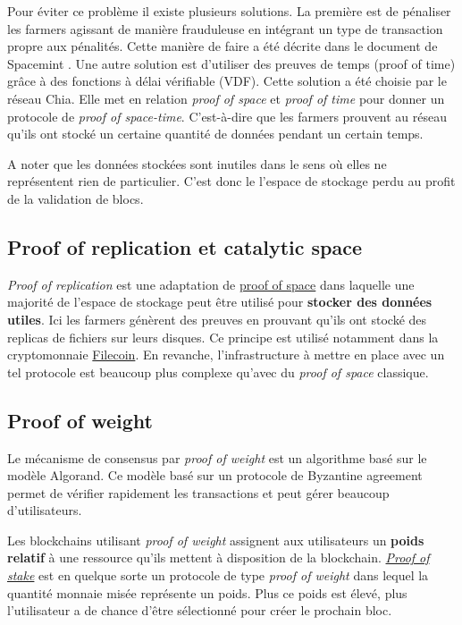 Pour éviter ce problème il existe plusieurs solutions. La première est de pénaliser les farmers agissant de manière frauduleuse en intégrant un type de transaction propre aux pénalités. Cette manière de faire a été décrite dans le document de Spacemint \cite{DBLP:conf/fc/ParkKFGAP18}. Une autre solution est d'utiliser des preuves de temps (proof of time) grâce à des fonctions à délai vérifiable (VDF). Cette solution a été choisie par le réseau Chia. Elle met en relation \emph{proof of space} et \emph{proof of time} pour donner un protocole de \emph{proof of space-time}. C'est-à-dire que les farmers prouvent au réseau qu'ils ont stocké un certaine quantité de données pendant un certain temps.

A noter que les données stockées sont inutiles dans le sens où elles ne représentent rien de particulier. C'est donc le l'espace de stockage perdu au profit de la validation de blocs.

\subsection{Proof of replication et catalytic space}

\emph{Proof of replication} est une adaptation de \hyperref[consensus:pospace]{proof of space} dans laquelle une majorité de l'espace de stockage peut être utilisé pour \textbf{stocker des données utiles}. Ici les farmers génèrent des preuves en prouvant qu'ils ont stocké des replicas de fichiers sur leurs disques. Ce principe est utilisé notamment dans la cryptomonnaie \href{https://filecoin.io/}{Filecoin}. En revanche, l'infrastructure à mettre en place avec un tel protocole est beaucoup plus complexe qu'avec du \emph{proof of space} classique.

\subsection{Proof of weight}

Le mécanisme de consensus par \emph{proof of weight} est un algorithme basé sur le modèle Algorand. Ce modèle basé sur un protocole de Byzantine agreement permet de vérifier rapidement les transactions et peut gérer beaucoup d'utilisateurs. 

Les blockchains utilisant \emph{proof of weight} assignent aux utilisateurs un \textbf{poids relatif} à une ressource qu'ils mettent à disposition de la blockchain. \hyperref[consensus:pos]{\emph{Proof of stake}} est en quelque sorte un protocole de type \emph{proof of weight} dans lequel la quantité monnaie misée représente un poids. Plus ce poids est élevé, plus l'utilisateur a de chance d'être sélectionné pour créer le prochain bloc.

